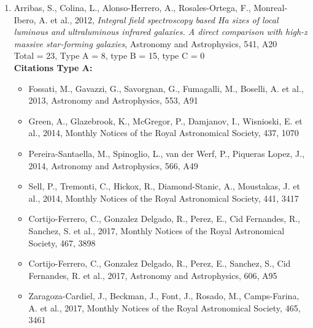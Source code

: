 \documentclass{letter}
\begin{document}
\begin{enumerate}
\begin{itemize}
\item Krabbe, A., Rosa, D., Pastoriza, M., Hagele, G., Cardaci, M. et al., 2017, Monthly Notices of the Royal Astronomical Society, 467, 27
\end{itemize}
{\bf Citations Type B:}
\begin{itemize}
\item Barrera-Ballesteros, J., Garcia-Lorenzo, B., Falcon-Barroso, J., van de Ven, G., Lyubenova, M. et al., 2015, Astronomy and Astrophysics, 582, A21
\item Pereira-Santaella, M., Alonso-Herrero, A., Colina, L., Miralles-Caballero, D., Perez-Gonzalez, P. et al., 2015, Astronomy and Astrophysics, 577, A78
\end{itemize}
\item Arribas, S., Colina, L., Alonso-Herrero, A., Rosales-Ortega, F., Monreal-Ibero, A. et al., 2012, {\it Integral field spectroscopy based Ha sizes of local luminous and ultraluminous infrared galaxies. A direct comparison with high-z massive star-forming galaxies}, Astronomy and Astrophysics, 541, A20 \\ 
Total = 23, Type A = 8, type B = 15, type C = 0 \\ 
{\bf Citations Type A:}
\begin{itemize}
\item Fossati, M., Gavazzi, G., Savorgnan, G., Fumagalli, M., Boselli, A. et al., 2013, Astronomy and Astrophysics, 553, A91
\item Green, A., Glazebrook, K., McGregor, P., Damjanov, I., Wisnioski, E. et al., 2014, Monthly Notices of the Royal Astronomical Society, 437, 1070
\item Pereira-Santaella, M., Spinoglio, L., van der Werf, P., Piqueras Lopez, J., 2014, Astronomy and Astrophysics, 566, A49
\item Sell, P., Tremonti, C., Hickox, R., Diamond-Stanic, A., Moustakas, J. et al., 2014, Monthly Notices of the Royal Astronomical Society, 441, 3417
\item Cortijo-Ferrero, C., Gonzalez Delgado, R., Perez, E., Cid Fernandes, R., Sanchez, S. et al., 2017, Monthly Notices of the Royal Astronomical Society, 467, 3898
\item Cortijo-Ferrero, C., Gonzalez Delgado, R., Perez, E., Sanchez, S., Cid Fernandes, R. et al., 2017, Astronomy and Astrophysics, 606, A95
\item Zaragoza-Cardiel, J., Beckman, J., Font, J., Rosado, M., Camps-Farina, A. et al., 2017, Monthly Notices of the Royal Astronomical Society, 465, 3461

\end{itemize}
\end{enumerate}
\end{document}
